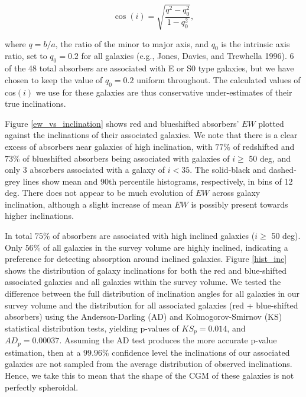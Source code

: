 \documentclass[twocolumn,tighten]{aastex6}
\begin{document}
\begin{equation}
	\cos(i) = \sqrt{\frac{q^2 - q_0^2}{1 - q_0^2}},
	\label{incEq}
\end{equation}

\noindent where $q = b/a$, the ratio of the minor to major axis, and $q_0$ is the intrinsic axis ratio, set to $q_0 = 0.2$ for all galaxies (e.g., Jones, Davies, and Trewhella 1996). 6 of the 48 total absorbers are associated with E or S0 type galaxies, but we have chosen to keep the value of $q_0 = 0.2$ uniform throughout. The calculated values of cos$(i)$ we use for these galaxies are thus conservative under-estimates of their true inclinations.

Figure \ref{ew_vs_inclination} shows red and blueshifted absorbers' $EW$ plotted against the inclinations of their associated galaxies. We note that there is a clear excess of absorbers near galaxies of high inclination, with $77\%$ of redshifted and $73\%$ of blueshifted absorbers being associated with galaxies of $i \geq$ 50 deg, and only 3 absorbers associated with a galaxy of $i<35$. The solid-black and dashed-grey lines show mean and 90th percentile histograms, respectively, in bins of 12 deg. There does not appear to be much evolution of $EW$ across galaxy inclination, although a slight increase of mean $EW$ is possibly present towards higher inclinations.

In total $75\%$ of absorbers are associated with high inclined galaxies ($i \geq$ 50 deg). Only $56\%$ of all galaxies in the survey volume are highly inclined, indicating a preference for detecting absorption around inclined galaxies. Figure \ref{hist_inc} shows the distribution of galaxy inclinations for both the red and blue-shifted associated galaxies and all galaxies within the survey volume. We tested the difference between the full distribution of inclination angles for all galaxies in our survey volume and the distribution for all associated galaxies (red + blue-shifted absorbers) using the Anderson-Darling (AD) and Kolmogorov-Smirnov (KS) statistical distribution tests, yielding p-values of $KS_{p} =0.014$, and $AD_{p} = 0.00037$. Assuming the AD test produces the more accurate p-value estimation, then at a $99.96\%$ confidence level the inclinations of our associated galaxies are not sampled from the average distribution of observed inclinations. Hence, we take this to mean that the shape of the CGM of these galaxies is not perfectly spheroidal. 
\end{document}
